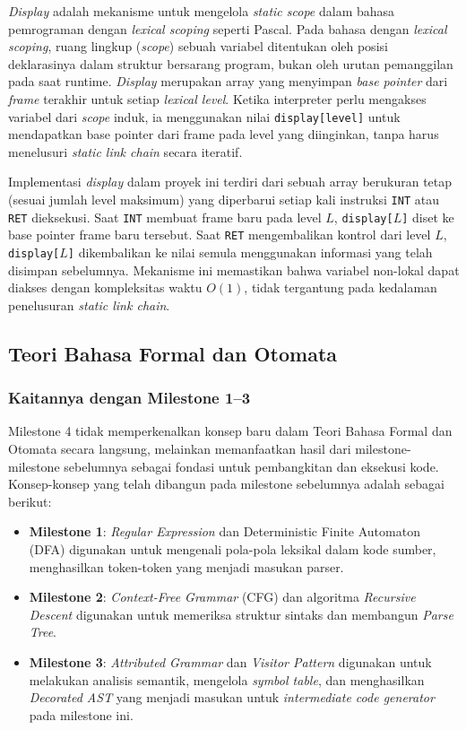 \documentclass[12pt,a4paper]{article}
\begin{document}
\textit{Display} adalah mekanisme untuk mengelola \textit{static scope} dalam
bahasa pemrograman dengan \textit{lexical scoping} seperti Pascal. Pada
bahasa dengan \textit{lexical scoping}, ruang lingkup (\textit{scope}) sebuah
variabel ditentukan oleh posisi deklarasinya dalam struktur bersarang program,
bukan oleh urutan pemanggilan pada saat runtime. \textit{Display} merupakan
array yang menyimpan \textit{base pointer} dari \textit{frame} terakhir untuk
setiap \textit{lexical level}. Ketika interpreter perlu mengakses variabel dari
\textit{scope} induk, ia menggunakan nilai \texttt{display[level]} untuk
mendapatkan base pointer dari frame pada level yang diinginkan, tanpa harus
menelusuri \textit{static link chain} secara iteratif.

Implementasi \textit{display} dalam proyek ini terdiri dari sebuah array
berukuran tetap (sesuai jumlah level maksimum) yang diperbarui setiap kali
instruksi \texttt{INT} atau \texttt{RET} dieksekusi. Saat \texttt{INT}
membuat frame baru pada level $L$, \texttt{display[$L$]} diset ke base pointer
frame baru tersebut. Saat \texttt{RET} mengembalikan kontrol dari level $L$,
\texttt{display[$L$]} dikembalikan ke nilai semula menggunakan informasi yang
telah disimpan sebelumnya. Mekanisme ini memastikan bahwa variabel non-lokal
dapat diakses dengan kompleksitas waktu $O(1)$, tidak tergantung pada kedalaman
penelusuran \textit{static link chain}.

\subsection{Teori Bahasa Formal dan Otomata}

\subsubsection{Kaitannya dengan Milestone 1--3}

Milestone 4 tidak memperkenalkan konsep baru dalam Teori Bahasa Formal dan
Otomata secara langsung, melainkan memanfaatkan hasil dari milestone-milestone
sebelumnya sebagai fondasi untuk pembangkitan dan eksekusi kode. Konsep-konsep
yang telah dibangun pada milestone sebelumnya adalah sebagai berikut:

\begin{itemize}
    \item \textbf{Milestone 1}: \textit{Regular Expression} dan Deterministic
        Finite Automaton (DFA) digunakan untuk mengenali pola-pola leksikal
        dalam kode sumber, menghasilkan token-token yang menjadi masukan parser.
    \item \textbf{Milestone 2}: \textit{Context-Free Grammar} (CFG) dan algoritma
        \textit{Recursive Descent} digunakan untuk memeriksa struktur sintaks
        dan membangun \textit{Parse Tree}.
    \item \textbf{Milestone 3}: \textit{Attributed Grammar} dan \textit{Visitor
        Pattern} digunakan untuk melakukan analisis semantik, mengelola
        \textit{symbol table}, dan menghasilkan \textit{Decorated AST} yang
        menjadi masukan untuk \textit{intermediate code generator} pada
        milestone ini.
\end{itemize}
\end{document}

